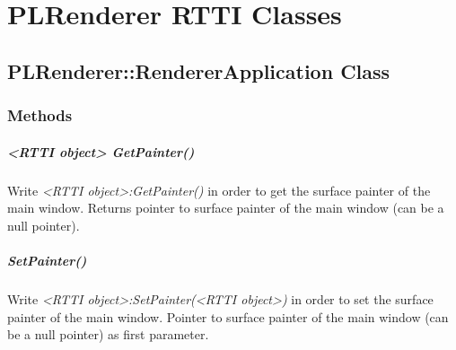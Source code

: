 \chapter{PLRenderer \ac{RTTI} Classes}




\section{PLRenderer::RendererApplication Class}


\subsection{Methods}

\paragraph{<RTTI object> GetPainter()}
Write \emph{<RTTI object>:GetPainter()} in order to get the surface painter of the main window. Returns pointer to surface painter of the main window (can be a null pointer).

\paragraph{SetPainter()}
Write \emph{<RTTI object>:SetPainter(<RTTI object>)} in order to set the surface painter of the main window. Pointer to surface painter of the main window (can be a null pointer) as first parameter.
